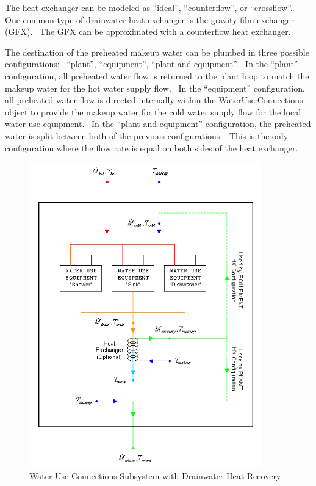 The heat exchanger can be modeled as ``ideal'', ``counterflow'', or ``crossflow''.~ One common type of drainwater heat exchanger is the gravity-film exchanger (GFX).~ The GFX can be approximated with a counterflow heat exchanger.

The destination of the preheated makeup water can be plumbed in three possible configurations:~ ``plant'', ``equipment'', ``plant and equipment''.~ In the ``plant'' configuration, all preheated water flow is returned to the plant loop to match the makeup water for the hot water supply flow.~ In the ``equipment'' configuration, all preheated water flow is directed internally within the WaterUse:Connections object to provide the makeup water for the cold water supply flow for the local water use equipment.~ In the ``plant and equipment'' configuration, the preheated water is split between both of the previous configurations.~ This is the only configuration where the flow rate is equal on both sides of the heat exchanger.

\begin{figure}[hbtp] %
\centering
\includegraphics[width=0.9\textwidth, height=0.9\textheight, keepaspectratio=true]{media/image7054.png}
\caption{Water Use Connections Subsystem with Drainwater Heat Recovery \protect \label{fig:water-use-connections-subsystem-with}}
\end{figure}

